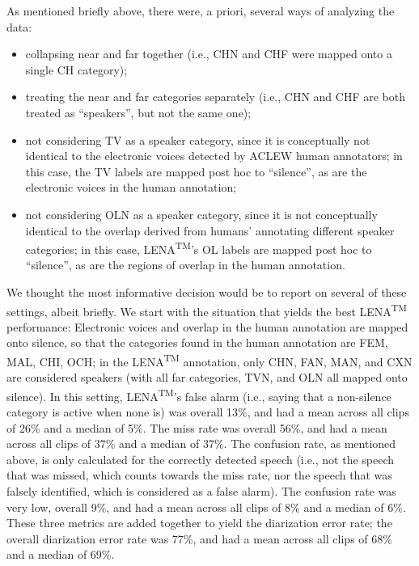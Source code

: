 \documentclass[english,table,man,floatsintext]{apa6}
\providecommand{\tightlist}{%
  \setlength{\itemsep}{0pt}\setlength{\parskip}{0pt}}
\begin{document}
As mentioned briefly above, there were, a priori, several ways of analyzing the data:

\begin{itemize}
\tightlist
\item
  collapsing near and far together (i.e., CHN and CHF were mapped onto a single CH category);
\item
  treating the near and far categories separately (i.e., CHN and CHF are both treated as \enquote{speakers}, but not the same one);
\item
  not considering TV as a speaker category, since it is conceptually not identical to the electronic voices detected by ACLEW human annotators; in this case, the TV labels are mapped post hoc to \enquote{silence}, as are the electronic voices in the human annotation;
\item
  not considering OLN as a speaker category, since it is not conceptually identical to the overlap derived from humans' annotating different speaker categories; in this case, LENA\textsuperscript{TM}'s OL labels are mapped post hoc to \enquote{silence}, as are the regions of overlap in the human annotation.
\end{itemize}

We thought the most informative decision would be to report on several of these settings, albeit briefly. We start with the situation that yields the best LENA\textsuperscript{TM} performance: Electronic voices and overlap in the human annotation are mapped onto silence, so that the categories found in the human annotation are FEM, MAL, CHI, OCH; in the LENA\textsuperscript{TM} annotation, only CHN, FAN, MAN, and CXN are considered speakers (with all far categories, TVN, and OLN all mapped onto silence). In this setting, LENA\textsuperscript{TM}'s false alarm (i.e., saying that a non-silence category is active when none is) was overall 13\%, and had a mean across all clips of 26\% and a median of 5\%. The miss rate was overall 56\%, and had a mean across all clips of 37\% and a median of 37\%.
The confusion rate, as mentioned above, is only calculated for the correctly detected speech (i.e., not the speech that was missed, which counts towards the miss rate, nor the speech that was falsely identified, which is considered as a false alarm). The confusion rate was very low, overall 9\%, and had a mean across all clips of 8\% and a median of 6\%. These three metrics are added together to yield the diarization error rate; the overall diarization error rate was 77\%, and had a mean across all clips of 68\% and a median of 69\%.
\end{document}
